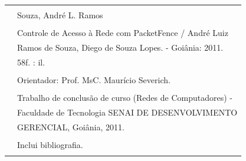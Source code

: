 \documentclass[brazil, ruledheader, pnumromarab,normaltoc]{abnt}
\begin{document}
\begin{minipage}{7cm}
\begin{center}
\vspace{.15\textwidth}
\begin{tabular}{|cl|} \hline
  \hspace{1.3cm} & \\
  & Souza, André L. Ramos\\
  & \\
  \hspace{0.2cm}  & \hspace{0.3cm} Controle de Acesso à Rede com PacketFence / André Luiz\\
  &  Ramos de Souza, Diego de Souza Lopes. - Goiânia: 2011.\\
  & \hspace{0.65cm} 58f. : il. \\
  & \\
  & \hspace{0.6cm} Orientador: Prof. MsC. Maurício Severich.\\
  & \\
  & \hspace{0.6cm} Trabalho de conclusão de curso (Redes de Computadores) -\\
  & \hspace{0.6cm} Faculdade de Tecnologia SENAI DE DESENVOLVIMENTO \\
  & \hspace{0.6cm} GERENCIAL, Goiânia, 2011.\\
  & \\
  & \hspace{0.6cm} Inclui bibliografia. \\
  & \\
 \hline
\end{tabular}
\end{center}
\end{minipage}
\end{document}
